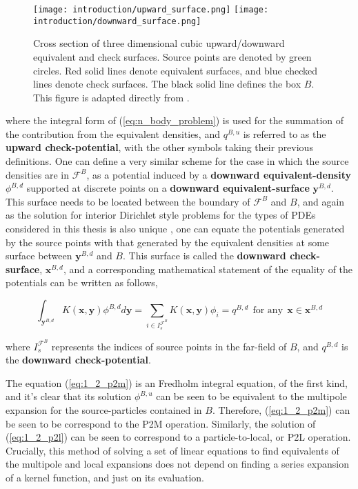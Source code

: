 \begin{figure}[!h]
    \centering
    {\texttt{[image: introduction/upward\_surface.png]}}
    \hfill
  {\texttt{[image: introduction/downward\_surface.png]}}
  \vspace{0pt}
  \caption{Cross section of three dimensional cubic upward/downward equivalent and
    check surfaces. Source points are denoted by green circles. Red solid lines
    denote equivalent surfaces, and blue checked lines denote check surfaces.
    The black solid line defines the box $B$. This figure is adapted directly from \cite{Ying:2004:JCP}.}
  \label{fig:1_2_upward_downward_surfaces}
\end{figure}

where the integral form of (\ref{eq:n_body_problem}) is used for the summation of
the contribution from the equivalent densities, and $q^{B, u}$ is referred to as
the \textbf{upward \gls{check-potential}}, with the other symbols taking their previous
definitions. One can define a very similar scheme for the case in which the source
densities are in $\mathcal{F}^B$, as a potential induced by a
\textbf{downward \gls{equivalent-density}} $\phi^{B,d}$ supported at discrete points
on a \textbf{downward \gls{equivalent-surface}} $\mathbf{y}^{B,d}$. This surface
needs to be located between the boundary of $\mathcal{F}^B$ and $B$, and again
as the solution for interior Dirichlet style problems for the types of PDEs
considered in this thesis is also unique \cite{Ying:2004:JCP}, one can equate the potentials generated
by the source points with that generated by the equivalent densities at some surface
between $\mathbf{y}^{B,d}$ and $B$. This surface is called the \textbf{downward \gls{check-surface}},
$\mathbf{x}^{B,d}$, and a corresponding mathematical statement of the equality of
the potentials can be written as follows,

\begin{equation}
    \int_{\mathbf{y}^{B,d}} K(\mathbf{x}, \mathbf{y})\phi^{B, d} d\mathbf{y} = \sum_{i \in I_s^{\mathcal{F}^B}} K(\mathbf{x}, \mathbf{y})\phi_i = q^{B, d} \> \> \text{for any} \> \> \mathbf{x} \in \mathbf{x}^{B, d}
    \label{eq:1_2_p2l}
\end{equation}

where $I_s^{\mathcal{F}^B}$ represents the indices of source points in the \gls{far-field}
of $B$, and $q^{B, d}$ is the \textbf{downward \gls{check-potential}}.

The equation (\ref{eq:1_2_p2m}) is an Fredholm integral
equation, of the first kind, and it's clear that its solution $\phi^{B, u}$
can be seen to be equivalent to the multipole expansion for the \gls{source-particles} contained in $B$. Therefore,
(\ref{eq:1_2_p2m}) can be seen to be correspond to the \gls{P2M}
operation. Similarly, the solution of (\ref{eq:1_2_p2l}) can be seen
to correspond to a particle-to-local, or P2L operation. Crucially, this method of solving
a set of linear equations to find equivalents of the multipole and local expansions
does not depend on finding a series expansion of a kernel function, and just on its evaluation.

